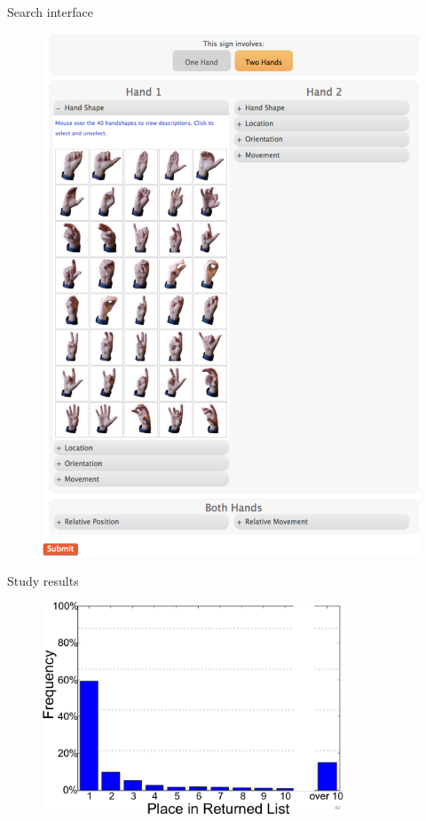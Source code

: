 
	\begin{frame}{Search interface}
		\begin{figure}
			\centering
			\includegraphics[height=0.9\textheight]{images/ASL-searchUI}
		\end{figure}
	\end{frame}

	\begin{frame}{Study results}
		\begin{figure}
			\centering
			\includegraphics[width=0.8\textwidth]{images/ASL-results-placement}
		\end{figure}
	\end{frame}

